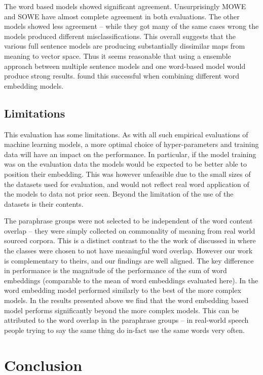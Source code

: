 \documentclass[]{book}
\begin{document}
The word based models showed significant agreement. Unsurprisingly
MOWE and SOWE have almost complete agreement in both evaluations.
The other models showed less agreement -- while they got many of the
same cases wrong the models produced different misclassifications.
This overall suggests that the various full sentence models are producing
substantially dissimilar maps from meaning to vector space. Thus it
seems reasonable that using a ensemble approach between multiple sentence
models and one word-based model would produce strong results. \citet{Yin2015} found this successful when combining different
word embedding models.


\subsection{Limitations}

This evaluation has some limitations. As with all such empirical evaluations
of machine learning models, a more optimal choice of hyper-parameters
and training data will have an impact on the performance. In particular,
if the model training was on the evaluation data the models would
be expected to be better able to position their embedding. This was
however unfeasible due to the small sizes of the datasets used for
evaluation, and would not reflect real word application of the models
to data not prior seen. Beyond the limitation of the use of the datasets
is their contents.

The paraphrase groups were not selected to be independent of the word
content overlap -- they were simply collected on commonality of meaning
from real world sourced corpora. This is a distinct contrast to the
the work of \citet{RitterPosition} discussed in 
where the classes were chosen to not have meaningful word overlap.
However our work is complementary to theirs, and our findings are
well aligned. The key difference in performance is the magnitude of
the performance of the sum of word embeddings (comparable to the mean
of word embeddings evaluated here). In \cite{RitterPosition} the
word embedding model performed similarly to the best of the more complex
models. In the results presented above we find that the word embedding
based model performs significantly beyond the more complex models.
This can be attributed to the word overlap in the paraphrase groups
-- in real-world speech people trying to say the same thing do in-fact
use the same words very often.


\section{Conclusion}
\end{document}
